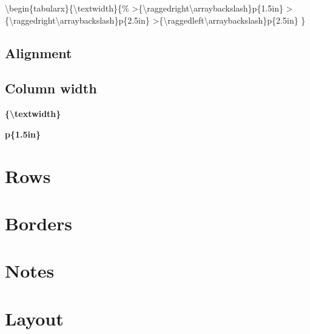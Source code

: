 \documentclass[
  letterpaper,
  DIV=11,
  numbers=noendperiod]{scrreprt}
\newenvironment{Shaded}{\begin{snugshade}}{\end{snugshade}}
\newcommand{\NormalTok}[1]{\textcolor[rgb]{0.00,0.23,0.31}{#1}}
\begin{document}

\begin{Shaded}
\begin{Highlighting}[]
\NormalTok{\textbackslash{}begin\{tabularx\}\{\textbackslash{}textwidth\}\{\%}
\NormalTok{  \textgreater{}\{\textbackslash{}raggedright\textbackslash{}arraybackslash\}p\{1.5in\} }
\NormalTok{  \textgreater{}\{\textbackslash{}raggedright\textbackslash{}arraybackslash\}p\{2.5in\}}
\NormalTok{  \textgreater{}\{\textbackslash{}raggedleft\textbackslash{}arraybackslash\}p\{2.5in\} }
\NormalTok{\}}
\end{Highlighting}
\end{Shaded}

\subsection*{Alignment}\label{alignment}

\subsection*{Column width}\label{column-width}

\textbf{\{\textbackslash textwidth\}}

\textbf{p\{1.5in\}}

\section*{Rows}\label{rows}


\section*{Borders}\label{borders}


\section*{Notes}\label{notes}


\section*{Layout}\label{layout}
\end{document}
